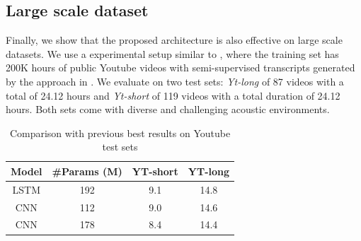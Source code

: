\subsection{Large scale dataset}
Finally, we show that the proposed architecture is also effective on large scale datasets. We use a experimental setup similar to \cite{Chiu19longform}, where the training set has 200K hours of public Youtube videos with semi-supervised transcripts generated by the approach in \cite{hank}. We evaluate on two test sets: \textit{Yt-long } of 87 videos with a total of 24.12 hours and \textit{Yt-short} of 119 videos with a total duration of 24.12 hours. Both sets come with diverse and challenging acoustic environments.


\begin{table}
\begin{centering}
\begin{tabular}{cccc}
\hline 
Model & \#Params (M) & YT-short & YT-long\tabularnewline
\hline 
\hline 
LSTM & 192 & 9.1 & 14.8\tabularnewline
CNN & 112 & 9.0 & 14.6\tabularnewline
CNN & 178 & 8.4 & 14.4\tabularnewline
\hline 
\end{tabular}
\par\end{centering}
\caption{Comparison with previous best results on Youtube test sets}

\end{table}


